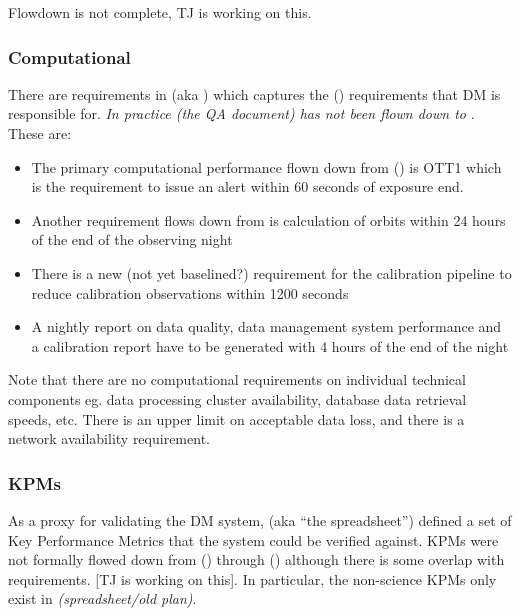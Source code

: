 \begin{note}
Flowdown is not complete, TJ is working on this.
\end{note}

\subsubsection{Computational}

There are requirements in  (aka \DMSR) which captures the  (\OSS) requirements that DM is responsible for. \textit{In practice  (the QA document) has not been flown down to }. These are:

\begin{itemize}

\item The primary computational performance flown down from  (\LSR) is OTT1 which is the requirement to issue an alert within 60 seconds of exposure end.

\item Another requirement flows down from  is calculation of orbits within 24 hours of the end of the observing night

\item There is a new (not yet baselined?) requirement for the calibration pipeline to reduce calibration observations within 1200 seconds

\item A nightly report on data quality, data management system performance and a calibration report have to be generated with 4 hours of the end of the night

\end{itemize}

Note that there are no computational requirements on individual technical components eg. data processing cluster availability, database data retrieval speeds, etc. There is an upper limit on acceptable data loss, and there is a network availability requirement.

\subsubsection{KPMs}


As a proxy for validating the DM system,  (aka “the spreadsheet”) defined a set of Key Performance Metrics that the system could be verified against. KPMs were not formally flowed down from  (\LSR) through  (\OSS) although there is some overlap with  requirements. [TJ is working on this]. In particular, the non-science KPMs only exist in  \textit{(spreadsheet/old plan)}.

